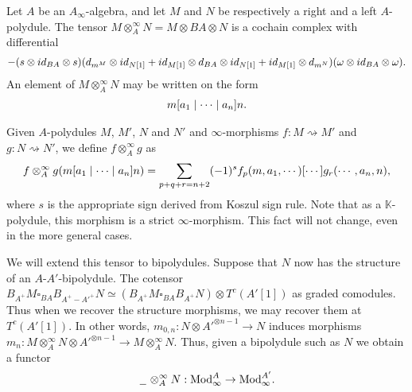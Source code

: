 \documentclass[../thesis.tex]{subfiles}
\begin{document}
            \begin{definition}
                Let $A$ be an $A_\infty$-algebra, and let $M$ and $N$ be respectively a right and a left $A$-polydule. The tensor $M \otimes^\infty_A N = M \otimes BA \otimes N$ is a cochain complex with differential
                \begin{align*}
                    -(s\otimes id_{BA} \otimes s)(d_{m^M} \otimes id_{N[1]} + id_{M[1]}\otimes d_{BA} \otimes id_{N[1]} + id_{M[1]}\otimes d_{m^N})(\omega \otimes id_{BA} \otimes \omega)\tt{.}
                \end{align*}
                An element of $M \otimes^\infty_A N$ may be written on the form
                \begin{align*}
                    m[a_1 \mid \cdots \mid a_n]n\tt{.}
                \end{align*}
            \end{definition}

            Given $A$-polydules $M$, $M'$, $N$ and $N'$ and $\infty$-morphisms $f : M \rightsquigarrow M'$ and $g : N \rightsquigarrow N'$, we define $f \otimes^\infty_A g$ as
            \begin{align*}
                f\otimes^\infty_Ag(m[a_1 \mid \cdots \mid a_n]n) = \sum_{p+q+r = n+2} (-1)^s f_p(m, a_1, \cdots)[\cdots]g_r(\cdots, a_n, n)\tt{,}
            \end{align*}
            where $s$ is the appropriate sign derived from Koszul sign rule. Note that as a $\mathbb{K}$-polydule, this morphism is a strict $\infty$-morphism. This fact will not change, even in the more general cases.

            We will extend this tensor to bipolydules. Suppose that $N$ now has the structure of an $A$-$A'$-bipolydule. The cotensor $B_{A^+}M \square_{BA} B_{A^+-A'^+}N \simeq (B_{A^+}M \square_{BA} B_{A^+}N) \otimes T^c(A'[1])$ as graded comodules. Thus when we recover the structure morphisms, we may recover them at $T^c(A'[1])$. In other words, $m_{0,n} : N \otimes A'^{\otimes n-1} \rightarrow N$ induces morphisms $m_n : M \otimes^\infty_A N \otimes A'^{\otimes n-1} \rightarrow M \otimes^\infty_A N$. Thus, given a bipolydule such as $N$ we obtain a functor
            \begin{align*}
                \argument\otimes^\infty_AN : \tt{Mod}_\infty^A \rightarrow \tt{Mod}_\infty^{A'}\tt{.}
            \end{align*}
\end{document}
